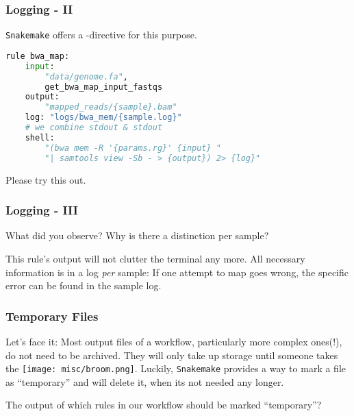 \begin{frame}[fragile]
  \frametitle{Logging - II}
  \texttt{Snakemake} offers a -directive for this purpose.  
  \begin{lstlisting}[language=Python,style=Python]
rule bwa_map:
    input:
        "data/genome.fa",
        get_bwa_map_input_fastqs
    output:
        "mapped_reads/{sample}.bam"
    log: "logs/bwa_mem/{sample.log}"
    # we combine stdout & stdout
    shell:
        "(bwa mem -R '{params.rg}' {input} "
        "| samtools view -Sb - > {output}) 2> {log}"
   \end{lstlisting}
   \begin{task}
     Please try this out.
   \end{task}
\end{frame}

\begin{frame}
  \frametitle{Logging - III}
  \begin{question}[Questions]
  	 What did you observe? Why is there a distinction per sample?
  \end{question}
  \pause
  \begin{docs}
  	This rule's output will not clutter the terminal any more. All necessary information is in a log \emph{per} sample: If one attempt to map goes wrong, the specific error can be found in the sample log.
  \end{docs}
\end{frame}

\begin{frame}[fragile]
  \frametitle{Temporary Files}
  Let's face it: Most output files of a workflow, particularly more complex ones(!), do not need to be archived. They will only take up storage until someone takes the \texttt{[image: misc/broom.png]}.\newline
  Luckily, \texttt{Snakemake} provides a way to mark a file as ``temporary'' and will delete it, when its not needed any longer.
  \pause
  \begin{question}
  	The output of which rules in our workflow should be marked ``temporary''?
  \end{question}
\end{frame}

